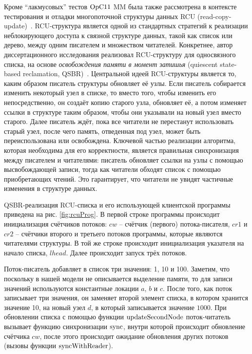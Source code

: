 Кроме ``лакмусовых'' тестов $\mathrm{OpC11}$ MM была также рассмотрена в контексте тестирования и отладки
многопоточной структуры данных RCU\label{acr:rcu} (read-copy-update)~\cite{McKenney-Slingwine:PDCS98,McKenney:PhD}.
RCU-структура является одной из стандартных стратегий к реализации неблокирующего доступа к
связной структуре данных, такой как список или дерево, между одним писателем и множеством читателей.
Конкретнее, автор диссертационного исследования реализовал RCU-структуру для односвязного списка, на основе
\emph{освобождения памяти в момент затишья} (quiescent state-based reclamation, QSBR)\label{acr:qsbr}~\cite{Desnoyers-al:TPDS12}.
Центральной идеей RCU-структуры является то, каким образом писатель структуры обновляет её узлы.
Если писатель собирается изменить некоторый узел в списке, то вместо того, чтобы
изменить его непосредственно, он создаёт копию старого узла, обновляет её, а потом изменяет ссылки в структуре
таким образом, чтобы они указывали на новый узел вместо старого.
Далее писатель ждёт, пока все читатели не перестанут использовать старый узел, после чего
память, отведенная под узел, может быть переиспользована или освобождена.
Ключевой частью реализации алгоритма, которая необходима для его корректности, является
правильная синхронизация между писателем и читателями:
писатель обновляет ссылки на узлы с помощью высвобождающей записи,
тогда как читатели обходят список с помощью приобретающих чтений.
Это гарантирует, что читатели не увидят частичные изменения в структуре данных.

QSBR-реализация RCU-списка и его использующей клиентской программы приведена на рис. \ref{fig:rcuProg}.
В первой строке программы происходит инициализация счётчиков потоков:
$cw$ -- счётчик (первого) потока-писателя,
$cr1$ и $cr2$ -- счётчики второго и третьего потоков программы, которые являются читателями структуры.
В той же строке происходит инициализация указателя на начало списка, $lhead$.
Далее происходит запуск трёх потоков.

Поток-писатель добавляет в список три значения: 1, 10 и 100.
Заметим, что поскольку в нашей модели не описывается выделение памяти, то для записи значений используются константные локации $a$, $b$ и $c$.
После того, как поток записывает три значения, он заменяет второй элемент списка, в котором хранится значение 10,
на новый узел $d$, в который записывается значение $1000$.
При обновлении списка с помощью функции ${\rm updateSecondNode}$
поток-читатель вызывает функцию синхронизации ${\rm sync}$, внутри которой происходит обновление
счётчика $cw$, после этого происходит ожидание обновления других потоков (вызовы функции ${\rm syncWithReader}$).

